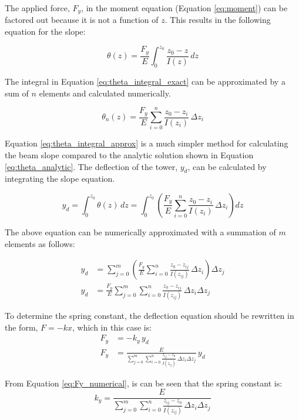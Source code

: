 The applied force, $F_y$, in the moment equation (Equation \ref{eq:moment}) can be factored out because it is not a function of $z$.  This results in the following equation for the slope:

\begin{equation} \label{eq:theta_integral_exact}
	\theta(z) = \frac{F_y}{E} \int_0^{z_0}{\frac{z_0-z}{I(z)}\,dz}
\end{equation}

The integral in Equation \ref{eq:theta_integral_exact} can be approximated by a sum of $n$ elements and calculated numerically.

\begin{equation} \label{eq:theta_integral_approx}
	\theta_n(z) = \frac{F_y}{E} \sum_{i=0}^{n}{\frac{z_0-z_i}{I(z_i)}\,\Delta z_i}
\end{equation}

Equation \ref{eq:theta_integral_approx} is a much simpler method for calculating the beam slope compared to the analytic solution shown in Equation \ref{eq:theta_analytic}.  The deflection of the tower, $y_d$, can be calculated by integrating the slope equation.

\begin{equation}
	y_d = \int_{0}^{z_0}{\theta(z)\,dz} = \int_{0}^{z_0}{\left(\frac{F_y}{E} \sum_{i=0}^{n}{\frac{z_0-z_i}{I(z_i)}\,\Delta z_i}\right)dz}
\end{equation}

The above equation can be numerically approximated with a summation of $m$ elements as follows:

\begin{align}
	y_d &= \sum_{j=0}^{m}{\left(\frac{F_y}{E} \sum_{i=0}^{n}{\frac{z_0-z_{ij}}{I(z_{ij})}\,\Delta z_i}\right) \Delta z_j} \\
	y_d &= \frac{F_y}{E}\sum_{j=0}^{m}{\sum_{i=0}^{n}{\frac{z_0-z_{ij}}{I(z_{ij})}\,\Delta z_i} \Delta z_j} \label{eq:deflection_equation_sum}
\end{align}

To determine the spring constant, the deflection equation should be rewritten in the form, $F=-kx$, which in this case is:
\begin{align}
	F_y &= -k_y \, y_d \\
	F_y &= \frac{E}{\sum_{j=0}^{m}{\sum_{i=0}^{n}{\frac{z_{ij}-z_0}{I(z_{ij})}\,\Delta z_i} \Delta z_j}} \, y_d \label{eq:Fy_numerical}
\end{align}

From Equation \ref{eq:Fy_numerical}, is can be seen that the spring constant is:
\begin{equation} \label{eq:ky}
	k_y = \frac{E}{\sum_{j=0}^{m}{\sum_{i=0}^{n}{\frac{z_{ij}-z_0}{I(z_{ij})}\,\Delta z_i} \Delta z_j}}
\end{equation}



